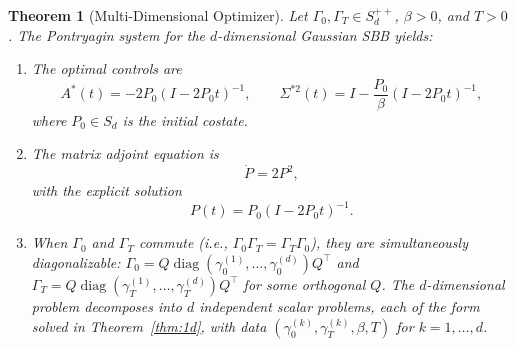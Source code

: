 \documentclass[12pt]{article}
\newtheorem{theorem}{Theorem}[section]
\theoremstyle{definition}
\newcommand{\Spp}{S_d^{++}}
\begin{document}
\begin{theorem}[Multi-Dimensional Optimizer]\label{thm:multid}
Let $\Gamma_0, \Gamma_T \in \Spp$, $\beta > 0$, and $T > 0$.
The Pontryagin system for the $d$-dimensional Gaussian SBB yields:
\begin{enumerate}[label=(\alph*)]
\item The optimal controls are
\begin{equation}\label{eq:opt-multid}
A^*(t) = -2P_0(I - 2P_0 t)^{-1}, \qquad
\Sigma^{*2}(t) = I - \frac{P_0}{\beta}(I - 2P_0 t)^{-1},
\end{equation}
where $P_0 \in S_d$ is the initial costate.

\item The matrix adjoint equation is
\begin{equation}\label{eq:riccati}
\dot P = 2P^2,
\end{equation}
with the explicit solution
\begin{equation}\label{eq:riccati-sol}
P(t) = P_0(I - 2P_0 t)^{-1}.
\end{equation}

\item When $\Gamma_0$ and $\Gamma_T$ commute (i.e., $\Gamma_0 \Gamma_T =
\Gamma_T \Gamma_0$), they are simultaneously diagonalizable:
$\Gamma_0 = Q \operatorname{diag}(\gamma_0^{(1)}, \ldots, \gamma_0^{(d)}) Q^\top$
and
$\Gamma_T = Q \operatorname{diag}(\gamma_T^{(1)}, \ldots, \gamma_T^{(d)}) Q^\top$
for some orthogonal $Q$.
The $d$-dimensional problem decomposes into $d$ independent scalar problems,
each of the form solved in Theorem~\ref{thm:1d}, with data
$(\gamma_0^{(k)}, \gamma_T^{(k)}, \beta, T)$ for $k = 1, \ldots, d$.
\end{enumerate}
\end{theorem}
\end{document}
